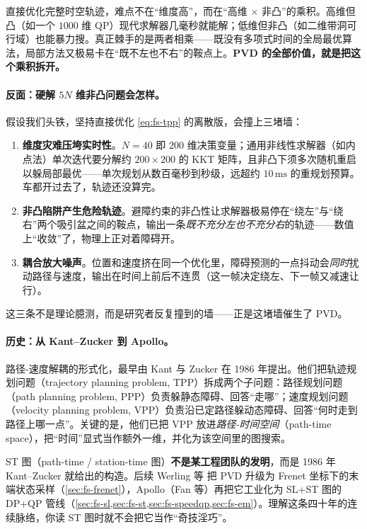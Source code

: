 \begin{insight}
直接优化完整时空轨迹，难点不在“维度高”，而在“高维 $\times$ 非凸”的乘积。高维但凸（如一个 $1000$ 维 QP）现代求解器几毫秒就能解；低维但非凸（如二维带洞可行域）也能暴力搜。真正棘手的是两者相乘——既没有多项式时间的全局最优算法，局部方法又极易卡在“既不左也不右”的鞍点上。\textbf{PVD 的全部价值，就是把这个乘积拆开。}
\end{insight}

\paragraph{反面：硬解 $5N$ 维非凸问题会怎样。}
假设我们头铁，坚持直接优化 \cref{eq:fs-tpp} 的离散版，会撞上三堵墙：
\begin{enumerate}
  \item \textbf{维度灾难压垮实时性}。$N=40$ 即 $200$ 维决策变量；通用非线性求解器（如内点法）单次迭代要分解约 $200\times200$ 的 KKT 矩阵，且非凸下须多次随机重启以躲局部最优——单次规划从数百毫秒到秒级，远超约 $10\,\mathrm{ms}$ 的重规划预算。车都开过去了，轨迹还没算完。
  \item \textbf{非凸陷阱产生危险轨迹}。避障约束的非凸性让求解器极易停在“绕左”与“绕右”两个吸引盆之间的鞍点，输出一条\emph{既不充分左也不充分右}的轨迹——数值上“收敛”了，物理上正对着障碍开。
  \item \textbf{耦合放大噪声}。位置和速度挤在同一个优化里，障碍预测的一点抖动会\emph{同时}扰动路径与速度，输出在时间上前后不连贯（这一帧决定绕左、下一帧又减速让行）。
\end{enumerate}
这三条不是理论臆测，而是研究者反复撞到的墙——正是这堵墙催生了 PVD。

\paragraph{历史：从 Kant--Zucker 到 Apollo。}
路径-速度解耦的形式化，最早由 Kant 与 Zucker 在 1986 年提出\cite{kant1986toward}。他们把轨迹规划问题（trajectory planning problem, TPP）拆成两个子问题：路径规划问题（path planning problem, PPP）负责躲静态障碍、回答“走哪”；速度规划问题（velocity planning problem, VPP）负责沿已定路径躲动态障碍、回答“何时走到路径上哪一点”。关键的是，他们已把 VPP 放进\emph{路径-时间空间}（path-time space），把“时间”显式当作额外一维，并化为该空间里的图搜索。

\begin{insight}
ST 图（path-time / station-time 图）\textbf{不是某工程团队的发明}，而是 1986 年 Kant--Zucker 就给出的构造\cite{kant1986toward}。后续 Werling 等\cite{werling2010frenet} 把 PVD 升级为 Frenet 坐标下的末端状态采样（\cref{sec:fs-frenet}），Apollo（Fan 等\cite{fan2018baidu}）再把它工业化为 SL+ST 图的 DP+QP 管线（\cref{sec:fs-sl,sec:fs-st,sec:fs-speedqp,sec:fs-em}）。理解这条四十年的连续脉络，你读 ST 图时就不会把它当作“奇技淫巧”。
\end{insight}

